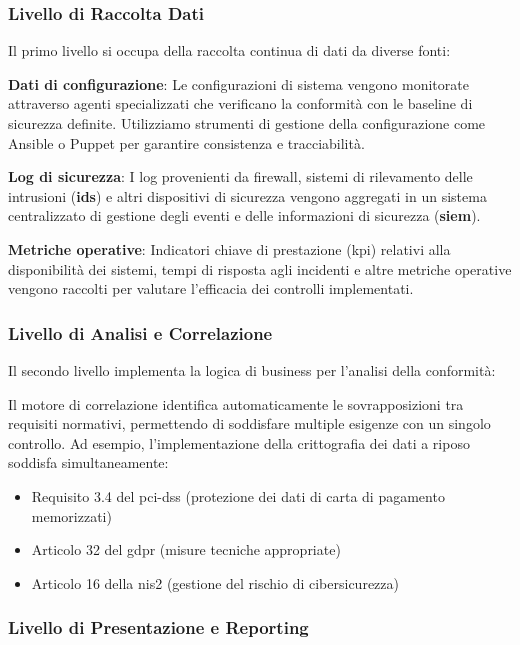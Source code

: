 \subsubsection{Livello di Raccolta Dati}

Il primo livello si occupa della raccolta continua di dati da diverse fonti:

\textbf{Dati di configurazione}: Le configurazioni di sistema vengono monitorate attraverso agenti specializzati che verificano la conformità con le baseline di sicurezza definite. Utilizziamo strumenti di gestione della configurazione come Ansible o Puppet per garantire consistenza e tracciabilità.

\textbf{Log di sicurezza}: I log provenienti da firewall, sistemi di rilevamento delle intrusioni (\textbf{\gls{ids}}) e altri dispositivi di sicurezza vengono aggregati in un sistema centralizzato di gestione degli eventi e delle informazioni di sicurezza (\textbf{\gls{siem}}).

\textbf{Metriche operative}: Indicatori chiave di prestazione (\gls{kpi}) relativi alla disponibilità dei sistemi, tempi di risposta agli incidenti e altre metriche operative vengono raccolti per valutare l'efficacia dei controlli implementati.

\subsubsection{Livello di Analisi e Correlazione}

Il secondo livello implementa la logica di business per l'analisi della conformità:

Il motore di correlazione identifica automaticamente le sovrapposizioni tra requisiti normativi, permettendo di soddisfare multiple esigenze con un singolo controllo. Ad esempio, l'implementazione della crittografia dei dati a riposo soddisfa simultaneamente:
\begin{itemize}
    \item Requisito 3.4 del \gls{pci-dss} (protezione dei dati di carta di pagamento memorizzati)
    \item Articolo 32 del \gls{gdpr} (misure tecniche appropriate)
    \item Articolo 16 della \gls{nis2} (gestione del rischio di cibersicurezza)
\end{itemize}

\subsubsection{Livello di Presentazione e Reporting}

